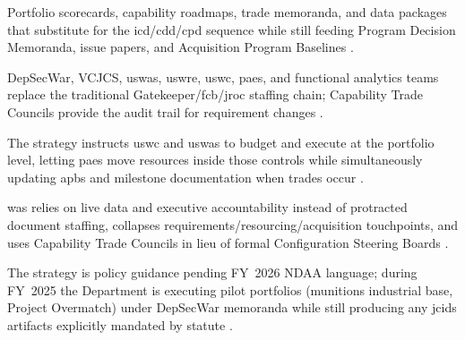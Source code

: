 \documentclass[../main.tex]{subfiles}
\begin{document}
\begin{description}[style=nextline,labelsep=0.5em,font=\bfseries]
  \item[\textbf{Outputs.}] Portfolio scorecards, capability roadmaps, trade memoranda, and data packages that substitute for the \ac{icd}/\ac{cdd}/\ac{cpd} sequence while still feeding Program Decision Memoranda, issue papers, and Acquisition Program Baselines \autocite{secwar-acq-transformation-2025}.
  \item[\textbf{Key players.}] DepSecWar, VCJCS, \ac{uswas}, \ac{uswre}, \ac{uswc}, \acp{pae}, and functional analytics teams replace the traditional Gatekeeper/\ac{fcb}/\ac{jroc} staffing chain; Capability Trade Councils provide the audit trail for requirement changes \autocite{secwar-acq-transformation-2025}.
  \item[\textbf{Integration with PPBE and the \ac{das}.}] The strategy instructs \ac{uswc} and \ac{uswas} to budget and execute at the portfolio level, letting \acp{pae} move resources inside those controls while simultaneously updating \ac{apb}s and milestone documentation when trades occur \autocite{secwar-acq-transformation-2025}.
  \item[\textbf{Differences from \ac{jcids}.}] \ac{was} relies on live data and executive accountability instead of protracted document staffing, collapses requirements/resourcing/acquisition touchpoints, and uses Capability Trade Councils in lieu of formal Configuration Steering Boards \autocite{secwar-acq-transformation-2025}.
  \item[\textbf{Legislative status.}] The strategy is policy guidance pending FY~2026 NDAA language; during FY~2025 the Department is executing pilot portfolios (munitions industrial base, Project Overmatch) under DepSecWar memoranda while still producing any \ac{jcids} artifacts explicitly mandated by statute \autocite{secwar-acq-transformation-2025}.
\end{description}
\end{document}
